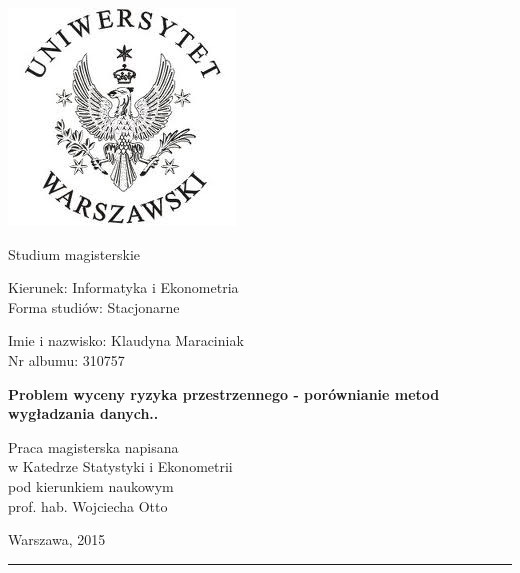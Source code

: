 \documentclass[polish, twoside, 12pt, a4paper]{article}
\theoremstyle{definition}
\theoremstyle{plain}
\theoremstyle{remark}
\begin{document}
\begin{titlepage}
\centering

\includegraphics[scale= 0.6]{uw_logo.JPG}

\vspace*{0.5cm}
Studium magisterskie\\
\begin{flushleft}
Kierunek: Informatyka i Ekonometria\\
Forma studiów: Stacjonarne
\end{flushleft}

\vspace*{.5cm}
\rule{0cm}{1cm}\hfill
\begin{minipage}{9cm}
Imie i nazwisko: Klaudyna Maraciniak\\
Nr albumu: 310757
\end{minipage}

\vspace*{1cm}
\begin{minipage}{12cm}
\centering
\Large
\textbf{Problem wyceny ryzyka przestrzennego - porównianie metod wygładzania danych..}
\end{minipage}

\vspace*{2cm}
\rule{0cm}{1cm}\hfill
\begin{minipage}{9cm}
Praca magisterska napisana\\
w Katedrze Statystyki i Ekonometrii\\
pod kierunkiem naukowym\\
prof. hab. Wojciecha Otto
\end{minipage}

\vfill
Warszawa, 2015
\end{titlepage}

\rule{1ex}{0ex}\clearpage

{\Large {} \par}
\end{document}

